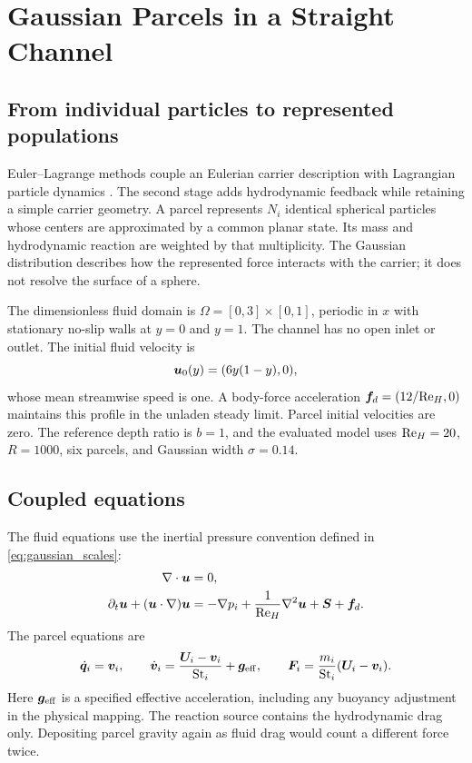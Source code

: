 \chapter{Gaussian Parcels in a Straight Channel}\label{ch:gaussian}

\section{From individual particles to represented populations}
Euler--Lagrange methods couple an Eulerian carrier description with
Lagrangian particle dynamics \citep{capecelatro2013,subramaniam2013}.
The second stage adds hydrodynamic feedback while retaining a simple
carrier geometry. %
 A parcel represents $N_i$ identical spherical particles
whose centers are approximated by a common planar state. Its mass and
hydrodynamic reaction are weighted by that multiplicity. The Gaussian
distribution describes how the represented force interacts with the
carrier; it does not resolve the surface of a sphere.

The dimensionless fluid domain is $\Omega=[0,3]\times[0,1]$, periodic in
$x$ with stationary no-slip walls at $y=0$ and $y=1$. The channel has no
open inlet or outlet. The initial fluid velocity is
\begin{equation}
 \bm{u}_0(y)=(6y(1-y),0),
 \label{eq:gaussian_initial}
\end{equation}
whose mean streamwise speed is one. A body-force acceleration
$\bm{f}_d=(12/\mathrm{Re}_H,0)$ maintains this profile in the unladen steady
limit. Parcel initial velocities are zero. The reference depth ratio is
$b=1$, and the evaluated model uses $\mathrm{Re}_H=20$, $R=1000$, six parcels,
and Gaussian width $\sigma=0.14$.

\section{Coupled equations}
The fluid equations use the inertial pressure convention defined in
\cref{eq:gaussian_scales}:
\begin{align}
 \nabla\cdot\bm{u}&=0,\\
 \partial_t\bm{u}+(\bm{u}\cdot\nabla)\bm{u}
 &=-\nabla p_i+\frac{1}{\mathrm{Re}_H}\nabla^2\bm{u}
   +\bm{S}+\bm{f}_d.
 \label{eq:gaussian_ns}
\end{align}
The parcel equations are
\begin{equation}
 \dot{\bm{q}}_i=\bm{v}_i,\qquad
 \dot{\bm{v}}_i=\frac{\bm{U}_i-\bm{v}_i}{\mathrm{St}_i}
 +\bm{g}_{\mathrm{eff}},\qquad
 \bm{F}_i=\frac{m_i}{\mathrm{St}_i}(\bm{U}_i-\bm{v}_i).
 \label{eq:gaussian_particle}
\end{equation}
Here $\bm{g}_{\mathrm{eff}}$ is a specified effective acceleration,
including any buoyancy adjustment in the physical mapping. The reaction
source contains the hydrodynamic drag only. Depositing parcel gravity again
as fluid drag would count a different force twice.

